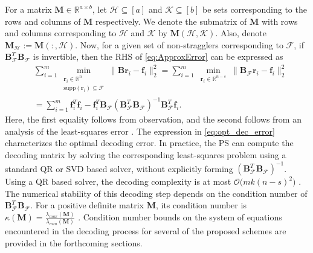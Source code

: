 \documentclass[journal,draftcls,onecolumn]{IEEEtran}
\theoremstyle{mystyle}
\newcommand{\bfB}{\mathbf{B}}
\newcommand{\bfM}{\mathbf{M}}
\newcommand{\cF}{\mathcal{F}}
\begin{document}
For a matrix $\mathbf{M} \in \mathbb{R}^{a \times b}$, let $\mathcal{H} \subseteq [a]$ and $\mathcal{K} \subseteq [b]$ be sets corresponding to the rows and columns of $\mathbf{M}$ respectively. We denote the submatrix of $\mathbf{M}$ with rows and columns corresponding to $\mathcal{H}$ and $\mathcal{K}$ by $\mathbf{M}(\mathcal{H}, \mathcal{K})$. Also, denote $\mathbf{M}_{\mathcal{H}} := \mathbf{M}(:, \mathcal{H})$. Now, for a given set of non-stragglers corresponding to $\mathcal{F}$, if $\mathbf{B}_{\mathcal{F}}^T\mathbf{B}_{\mathcal{F}}$ is invertible, then the RHS of \eqref{eq:ApproxError} can be expressed as
\begin{align}
&\sum_{i =1}^m \min\limits_{\substack{\mathbf{r}_i\in \mathbb{R}^{n} \\ \text{supp}(\mathbf{r}_i) \subseteq \mathcal{F} }}   \|\bfB\mathbf{r}_i - \mathbf{f}_i\|_2^2 %
 = \sum_{i =1}^m \min\limits_{\substack{\mathbf{r}_i\in \mathbb{R}^{n-s} }}   \|\bfB_{\mathcal{F}}\mathbf{r}_i - \mathbf{f}_i\|_2^2 \nonumber\\
& = \sum_{i =1}^m\mathbf{f}_i^T \mathbf{f}_i - \mathbf{f}_i^T \bfB_{\cF}(\bfB_{\cF}^T\bfB_{\cF})^{-1}\bfB_{\cF}^T\mathbf{f}_i.\label{eq:opt_dec_error}
\end{align}
Here, the first equality follows from observation, and the second follows from an analysis of the least-squares error \cite{ekf}. The expression in \eqref{eq:opt_dec_error} characterizes the optimal decoding error. In practice, the PS can compute the decoding matrix by solving the corresponding least-squares problem using a standard QR or SVD based solver, without explicitly forming 
$(\mathbf{B}_{\mathcal{F}}^{T}\mathbf{B}_{\mathcal{F}})^{-1}$. 
Using a QR based solver, the decoding complexity is at most 
$\mathcal{O}\bigl(mk(n-s)^2\bigr)$ \cite{golub2013matrix}. 
The numerical stability of this decoding step depends on the condition number of 
$\mathbf{B}_{\mathcal{F}}^{T}\mathbf{B}_{\mathcal{F}}$. For a positive definite matrix $\bfM$, its condition number is $\kappa(\bfM) = \frac{\lambda_{max}(\bfM)} {\lambda_{min}(\bfM)}$ \cite{horn2012matrix}. Condition number bounds on the system of equations encountered in the decoding process for several of the proposed schemes are provided in the forthcoming sections.
\end{document}

